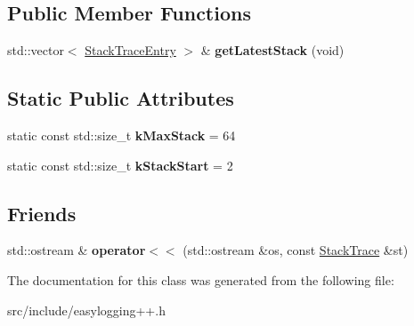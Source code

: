 \subsection*{Public Member Functions}
\begin{DoxyCompactItemize}
\item 
\mbox{\label{classel_1_1base_1_1debug_1_1_stack_trace_a8b6a4f154b59d597b73fe8a515df3240}} 
std\+::vector$<$ \hyperlink{classel_1_1base_1_1debug_1_1_stack_trace_1_1_stack_trace_entry}{Stack\+Trace\+Entry} $>$ \& {\bfseries get\+Latest\+Stack} (void)
\end{DoxyCompactItemize}
\subsection*{Static Public Attributes}
\begin{DoxyCompactItemize}
\item 
\mbox{\label{classel_1_1base_1_1debug_1_1_stack_trace_a6e3db7fdc258a7d653f00fc5aade55c2}} 
static const std\+::size\+\_\+t {\bfseries k\+Max\+Stack} = 64
\item 
\mbox{\label{classel_1_1base_1_1debug_1_1_stack_trace_ab8a89fe5c4f779d3e685a5e61f1136e2}} 
static const std\+::size\+\_\+t {\bfseries k\+Stack\+Start} = 2
\end{DoxyCompactItemize}
\subsection*{Friends}
\begin{DoxyCompactItemize}
\item 
\mbox{\label{classel_1_1base_1_1debug_1_1_stack_trace_a3b8e978df331fbe725e2a39d031355cc}} 
std\+::ostream \& {\bfseries operator$<$$<$} (std\+::ostream \&os, const \hyperlink{classel_1_1base_1_1debug_1_1_stack_trace}{Stack\+Trace} \&st)
\end{DoxyCompactItemize}


The documentation for this class was generated from the following file\+:\begin{DoxyCompactItemize}
\item 
src/include/easylogging++.\+h\end{DoxyCompactItemize}
